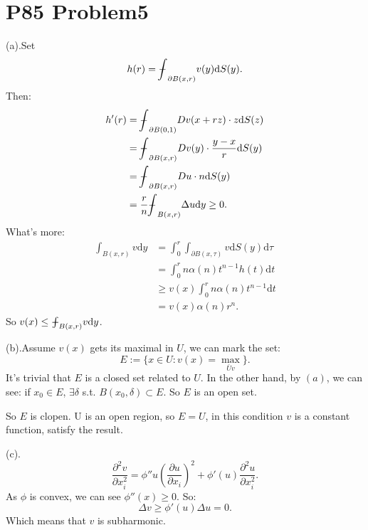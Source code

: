 \documentclass[a4paper]{ctexart}
\newcommand{\dif}{\mathrm{d}}
\newcommand{\pdfFrac}[2]{\frac{\partial #1}{\partial #2}}
\newcommand\tbbint{{-\mkern -16mu\int}}
\newcommand\dbbint{{-\mkern -19mu\int}}
\newcommand\bbint{
{\mathchoice{\dbbint}{\tbbint}{\tbbint}{\tbbint}}
}
\begin{document}
\section*{P85 Problem5}
(a).Set
\begin{equation}
    h(r)=\bbint_{\partial B(x,r)}v(y)\dif S(y).
\end{equation}
Then:
\begin{equation}
    \begin{aligned}
        h'(r)&=\bbint_{\partial B(0,1)}Dv(x+rz)\cdot z\dif S(z)\\
        &=\bbint_{\partial B(x,r)}Dv(y)\cdot\frac{y-x}{r}\dif S(y)\\
        &=\bbint_{\partial B(x,r)}Du\cdot n\dif S(y)\\
        &=\frac{r}{n}\bbint_{B(x,r)}\Delta u\dif y\ge0.\\
    \end{aligned}
\end{equation}
What's more:
\begin{equation}
    \begin{aligned}
        \int_{B(x,r)}v\dif y&=\int_{0}^{r}\int_{\partial B(x,\tau)}v\dif S(y)\dif\tau\\
        &=\int_{0}^{r}n\alpha(n)t^{n-1}h(t)\dif t\\
        &\ge v(x)\int_{0}^{r}n\alpha(n)t^{n-1}\dif t\\
        &=v(x)\alpha(n)r^{n}.
    \end{aligned}
\end{equation}
So $v(x)\le\bbint_{B(x,r)}v\dif y$.

(b).Assume $v(x)$ gets its maximal in $U$, we can mark the set:
\begin{equation}
    E:=\{x\in U:v(x)=\max_{\bar{U}v}\}.
\end{equation}
It's trivial that $E$ is a closed set related to $U$. In the other hand, by $(a)$, we can see: 
if $x_{0}\in E$, $\exists\delta$ s.t. $B(x_{0},\delta)\subset E$. So $E$ is an open set.

So $E$ is clopen. U is an open region, so $E=U$, in this condition $v$ is a constant function, 
satisfy the result.

(c).
\begin{equation}
    \frac{\partial^{2}v}{\partial x_{i}^{2}}=\phi''u(\pdfFrac{u}{x_{i}})^{2}+\phi'(u)\pdfFrac{^{2}u}{x_{i}^{2}}.
\end{equation}
As $\phi$ is convex, we can see $\phi''(x)\ge 0$. So:
\begin{equation}
    \Delta v\ge\phi'(u)\Delta u=0.
\end{equation}
Which means that $v$ is subharmonic.
\end{document}
